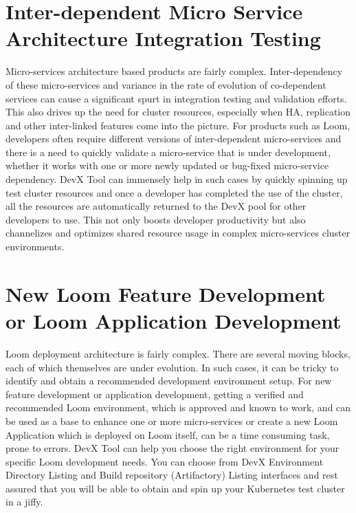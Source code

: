 \documentclass[letterpaper,10pt,english]{sphinxmanual}
\begin{document}
\section{Inter-dependent Micro Service Architecture Integration Testing}
\label{\detokenize{devx:inter-dependent-micro-service-architecture-integration-testing}}
Micro-services architecture based products are fairly complex. Inter-dependency of these micro-services and variance in the rate of evolution of co-dependent services can cause a significant spurt in integration testing and validation efforts.  This also drives up the need for cluster resources, especially when HA, replication and other inter-linked features come into the picture. For products such as Loom, developers often require different versions of inter-dependent micro-services and there is a need to quickly validate a micro-service that is under development, whether it works with one or more newly updated or bug-fixed micro-service dependency. DevX Tool can immensely help in such cases by quickly spinning up test cluster resources and once a developer has completed the use of the cluster, all the resources are automatically returned to the DevX pool for other developers to use.  This not only boosts developer productivity but also channelizes and optimizes shared resource usage in complex micro-services cluster environments.


\section{New Loom Feature Development or Loom Application Development}
\label{\detokenize{devx:new-loom-feature-development-or-loom-application-development}}
Loom deployment architecture is fairly complex. There are several moving blocks, each of which themselves are under evolution. In such cases, it can be tricky to identify and obtain a recommended development environment setup. For new feature development or application development, getting a verified and recommended Loom environment, which is approved and known to work, and can be used as a base to enhance one or more micro-services or create a new Loom Application which is deployed on Loom itself, can be a time consuming task, prone to errors.  DevX Tool can help you choose the right environment for your specific Loom development needs. You can choose from DevX Environment Directory Listing and Build repository (Artifactory) Listing interfaces and rest assured that you will be able to obtain and spin up your Kubernetes test cluster in a jiffy.
\end{document}
